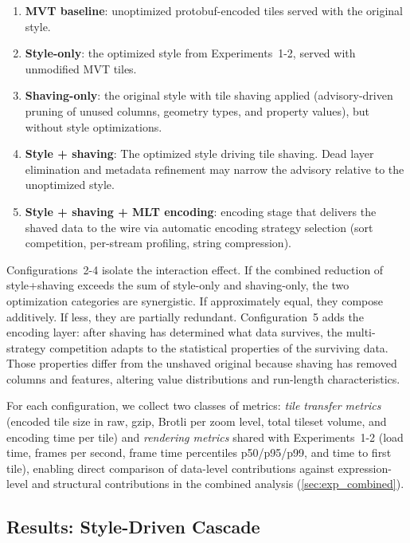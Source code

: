 \begin{enumerate}
    \item \textbf{\ac{MVT} baseline}: unoptimized protobuf-encoded tiles served with the original style.
    \item \textbf{Style-only}: the optimized style from Experiments~1-2, served with unmodified \ac{MVT} tiles.
    \item \textbf{Shaving-only}: the original style with tile shaving applied (advisory-driven pruning of unused columns, geometry types, and property values), but without style optimizations.
    \item \textbf{Style + shaving}: The optimized style driving tile shaving.
    Dead layer elimination and metadata refinement may narrow the advisory relative to the unoptimized style.
    \item \textbf{Style + shaving + \ac{MLT} encoding}: encoding stage that delivers the shaved data to the wire via automatic encoding strategy selection (sort competition, per-stream profiling, string compression).
\end{enumerate}

\noindent Configurations~2-4 isolate the interaction effect.
If the combined reduction of style+shaving exceeds the sum of style-only and shaving-only, the two optimization categories are synergistic.
If approximately equal, they compose additively.
If less, they are partially redundant.
Configuration~5 adds the encoding layer: after shaving has determined what data survives, the multi-strategy competition adapts to the statistical properties of the surviving data.
Those properties differ from the unshaved original because shaving has removed columns and features, altering value distributions and run-length characteristics.

For each configuration, we collect two classes of metrics: \emph{tile transfer metrics} (encoded tile size in raw, gzip, Brotli per zoom level, total tileset volume, and encoding time per tile) and \emph{rendering metrics} shared with Experiments~1-2 (load time, frames per second, frame time percentiles p50/p95/p99, and time to first tile), enabling direct comparison of data-level contributions against expression-level and structural contributions in the combined analysis (\cref{sec:exp_combined}).

\subsection{Results: Style-Driven Cascade}\label{sub:mlt_results}

